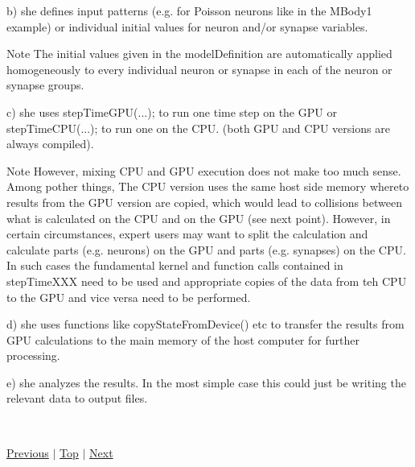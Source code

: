 \begin{DoxyEnumerate}
b) she defines input patterns (e.\+g. for Poisson neurons like in the M\+Body1 example) or individual initial values for neuron and/or synapse variables. \begin{DoxyNote}{Note}
The initial values given in the {\ttfamily model\+Definition} are automatically applied homogeneously to every individual neuron or synapse in each of the neuron or synapse groups.
\end{DoxyNote}
c) she uses {\ttfamily step\+Time\+G\+P\+U(...);} to run one time step on the G\+P\+U or {\ttfamily step\+Time\+C\+P\+U(...);} to run one on the C\+P\+U. (both G\+P\+U and C\+P\+U versions are always compiled). \begin{DoxyNote}{Note}
However, mixing C\+P\+U and G\+P\+U execution does not make too much sense. Among pother things, The C\+P\+U version uses the same host side memory whereto results from the G\+P\+U version are copied, which would lead to collisions between what is calculated on the C\+P\+U and on the G\+P\+U (see next point). However, in certain circumstances, expert users may want to split the calculation and calculate parts (e.\+g. neurons) on the G\+P\+U and parts (e.\+g. synapses) on the C\+P\+U. In such cases the fundamental kernel and function calls contained in {\ttfamily step\+Time\+X\+X\+X} need to be used and appropriate copies of the data from teh C\+P\+U to the G\+P\+U and vice versa need to be performed.
\end{DoxyNote}
d) she uses functions like {\ttfamily copy\+State\+From\+Device()} etc to transfer the results from G\+P\+U calculations to the main memory of the host computer for further processing.

e) she analyzes the results. In the most simple case this could just be writing the relevant data to output files.
\end{DoxyEnumerate}

~\newline
 

 \hyperlink{Installation_sec}{Previous} $\vert$ \hyperlink{Quickstart_sec}{Top} $\vert$ \hyperlink{Examples_sec}{Next} 